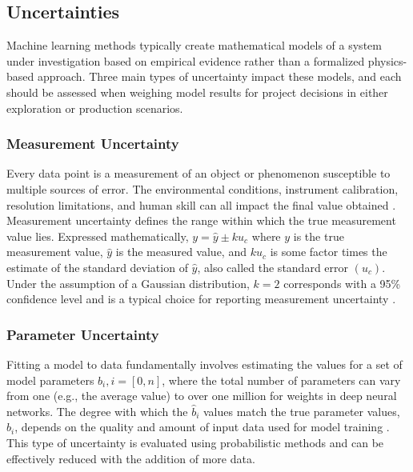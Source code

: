 \subsection{Uncertainties} \label{ch2:uncertainty}
Machine learning methods typically create mathematical models of a system under investigation based on empirical evidence rather than a formalized physics-based approach. Three main types of uncertainty impact these models, and each should be assessed when weighing model results for project decisions in either exploration or production scenarios. 

\subsubsection{Measurement Uncertainty}\label{ch2:measurement_uncertainty}
Every data point is a measurement of an object or phenomenon susceptible to multiple sources of error. The environmental conditions, instrument calibration, resolution limitations, and human skill can all impact the final value obtained \citep[p.\ 11-14]{baird_experimentation_1962}. Measurement uncertainty defines the range within which the true measurement value lies. Expressed mathematically, $y=\hat{y} \pm ku_c$ where $y$ is the true measurement value, $\hat{y}$ is the measured value, and $ku_c$ is some factor times the estimate of the standard deviation of $\hat{y}$, also called the standard error $(u_c)$. Under the assumption of a Gaussian distribution, $k=2$  corresponds with a 95\% confidence level and is a typical choice for reporting measurement uncertainty \citep{nist_nist_2021}.

\subsubsection{Parameter Uncertainty}\label{ch2:parameter_uncertainty}
Fitting a model to data fundamentally involves estimating the values for a set of model parameters $b_i, i = [0, n]$, where the total number of parameters can vary from one (e.g., the average value) to over one million for weights in deep neural networks. The degree with which the $\hat{b}_i$ values match the true parameter values, $b_i$, depends on the quality and amount of input data used for model training \citep[p.\ 81]{james_introduction_2013}. This type of uncertainty is evaluated using probabilistic methods and can be effectively reduced with the addition of more data. 

